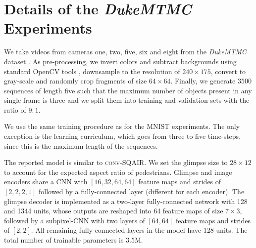 \section{Details of the \textit{DukeMTMC} Experiments}
\label{app:duke_details}

We take videos from cameras one, two, five, six and eight from the \textit{DukeMTMC} dataset \citep{ristani2016performance}. As pre-processing, we invert colors and subtract backgrounds using standard OpenCV tools \citep{itseez2015opencv}, downsample to the resolution of $240 \times 175$, convert to gray-scale and randomly crop fragments of size $64 \times 64$. Finally, we generate $3500$ sequences of length five such that the maximum number of objects present in any single frame is three and we split them into training and validation sets with the ratio of $9:1$.

We use the same training procedure as for the \gls{MNIST} experiments. The only exception is the learning curriculum, which goes from three to five time-steps, since this is the maximum length of the sequences. 

The reported model is similar to \textsc{conv}-\gls{SQAIR}. We set the glimpse size to $28 \times 12$ to account for the expected aspect ratio of pedestrians. Glimpse and image encoders share a \gls{CNN} with $[16,32,64,64]$ feature maps and strides of $[2,2,2,1]$ followed by a fully-connected layer (different for each encoder). The glimpse decoder is implemented as a two-layer fully-connected network with 128 and 1344 units, whose outputs are reshaped into 64 feature maps of size $7 \times 3$, followed by a subpixel-\gls{CNN} with two layers of $[64, 64]$ feature maps and strides of $[2, 2]$. All remaining fully-connected layers in the model have 128 units. The total number of trainable parameters is $3.5$M.